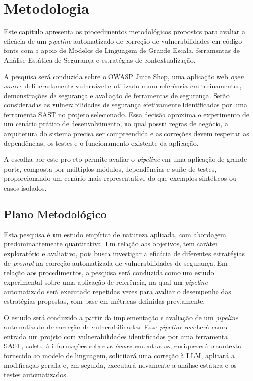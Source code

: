 \chapter[Metodologia]{Metodologia}

Este capítulo apresenta os procedimentos metodológicos propostos para avaliar a eficácia de um \textit{pipeline} automatizado de correção de vulnerabilidades em código-fonte com o apoio de Modelos de Linguagem de Grande Escala, ferramentas de Análise Estática de Segurança e estratégias de contextualização.

A pesquisa será conduzida sobre o OWASP Juice Shop, uma aplicação web \textit{open source} deliberadamente vulnerável e utilizada como referência em treinamentos, demonstrações de segurança e avaliação de ferramentas de segurança. Serão consideradas as vulnerabilidades de segurança efetivamente identificadas por uma ferramenta SAST no projeto selecionado. Essa decisão aproxima o experimento de um cenário prático de desenvolvimento, no qual possui regras de negócio, a arquitetura do sistema precisa ser compreendida e as correções devem respeitar as dependências, os testes e o funcionamento existente da aplicação.

A escolha por este projeto permite avaliar o \textit{pipeline} em uma aplicação de grande porte, composta por múltiplos módulos, dependências e suíte de testes, proporcionando um cenário mais representativo do que exemplos sintéticos ou casos isolados.


\section{Plano Metodológico}

Esta pesquisa é um estudo empírico de natureza aplicada, com abordagem predominantemente quantitativa. Em relação aos objetivos, tem caráter exploratório e avaliativo, pois busca investigar a eficácia de diferentes estratégias de \textit{prompt} na correção automatizada de vulnerabilidades de segurança. Em relação aos procedimentos, a pesquisa será conduzida como um estudo experimental sobre uma aplicação de referência, na qual um \textit{pipeline} automatizado será executado repetidas vezes para avaliar o desempenho das estratégias propostas, com base em métricas definidas previamente.

O estudo será conduzido a partir da implementação e avaliação de um \textit{pipeline} automatizado de correção de vulnerabilidades. Esse \textit{pipeline} receberá como entrada um projeto com vulnerabilidades identificadas por uma ferramenta SAST, coletará informações sobre as \textit{issues} encontradas, enriquecerá o contexto fornecido ao modelo de linguagem, solicitará uma correção à LLM, aplicará a modificação gerada e, em seguida, executará novamente a análise estática e os testes automatizados.

